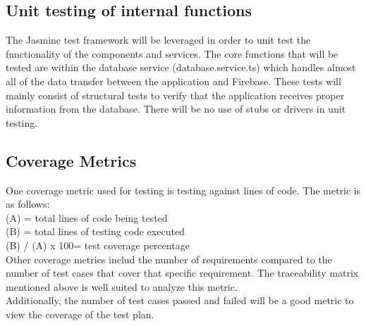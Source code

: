 \documentclass[12pt,fleqn]{article}
\begin{document}
\subsection{Unit testing of internal functions}
The Jasmine test framework will be leveraged in order to unit test the functionality of the components and services. The core functions that will be tested are within the database service (database.service.ts) which handles almost all of the data transfer between the application and Firebase. These tests will mainly consist of structural tests to verify that the application receives proper information from the database. There will be no use of stubs or drivers in unit testing.

\subsection{Coverage Metrics}
One coverage metric used for testing is testing against lines of code. The metric is as follows: \\
(A) = total lines of code being tested \\
(B) = total lines of testing code executed \\
(B) / (A)  x 100= test coverage percentage\\

Other coverage metrics includ the number of requirements compared to the number of test cases that cover that specific requirement.  The traceability matrix mentioned above is well suited to analyze this metric.  \\

Additionally, the number of test cases passed and failed will be a good metric to view the coverage of the test plan.  
\end{document}
